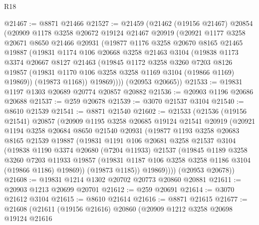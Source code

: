 \begin{lexlean}{R18}
\begin{coremodule}
@21467 := @8871 @21466
@21527 := @21459
    (@21462
      (@19156 @21467)
      @20854
      (@20909
        @1178
        @3258
        @20672
        @19124
        @21467
        @20919
        (@20921
          @1177
          @3258
          @20671
          @8650
          @21466
          @20931
          (@19877
            @1176
            @3258
            @20670
            @8165
            @21465
            @19887
            (@19831
              @1174
              @106
              @20668
              @3258
              @21463
              @3104
              (@19838
                @1173
                @3374
                @20667
                @8127
                @21463
                (@19845
                  @1172
                  @3258
                  @3260
                  @7203
                  @8126
                  @19857
                  (@19831 @1170 @106 @3258 @3258 @1169 @3104 (@19866 @1169) @19869))
                (@19873 @1168))
              @19869))))
      (@20953 @20665))
@21533 := @19831 @1197 @1303 @20689 @20774 @20857 @20882
@21536 := @20903 @1196 @20686 @20688
@21537 := @259 @20678
@21539 := @3070 @21537 @3104
@21540 := @8610 @21539
@21541 := @8871 @21540
@21602 := @21533
    (@21536
      (@19156 @21541)
      @20857
      (@20909
        @1195
        @3258
        @20685
        @19124
        @21541
        @20919
        (@20921
          @1194
          @3258
          @20684
          @8650
          @21540
          @20931
          (@19877
            @1193
            @3258
            @20683
            @8165
            @21539
            @19887
            (@19831
              @1191
              @106
              @20681
              @3258
              @21537
              @3104
              (@19838
                @1190
                @3374
                @20680
                (@7204 @11933)
                @21537
                (@19845
                  @1189
                  @3258
                  @3260
                  @7203
                  @11933
                  @19857
                  (@19831 @1187 @106 @3258 @3258 @1186 @3104 (@19866 @1186) @19869))
                (@19873 @1185))
              @19869))))
      (@20953 @20678))
@21608 := @19831 @1214 @1302 @20702 @20773 @20860 @20881
@21611 := @20903 @1213 @20699 @20701
@21612 := @259 @20691
@21614 := @3070 @21612 @3104
@21615 := @8610 @21614
@21616 := @8871 @21615
@21677 := @21608
    (@21611
      (@19156 @21616)
      @20860
      (@20909
        @1212
        @3258
        @20698
        @19124
        @21616

\end{coremodule}
\end{lexlean}
